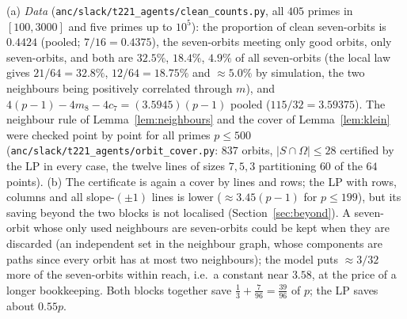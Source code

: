 \begin{remark}
(a) \emph{Data} (\texttt{anc/slack/t221\_agents/clean\_counts.py}, all $405$ primes in $[100,3000]$ and five primes up to $10^5$): the
proportion of clean seven-orbits is $0.4424$ (pooled; $7/16=0.4375$), the seven-orbits meeting only good orbits, only seven-orbits, and
both are $32.5\%$, $18.4\%$, $4.9\%$ of all seven-orbits (the local law gives $21/64=32.8\%$, $12/64=18.75\%$ and $\approx5.0\%$ by
simulation, the two neighbours being positively correlated through $m$), and $4(p-1)-4m_8-4c_7=(3.5945)(p-1)$ pooled
($115/32=3.59375$).  The neighbour rule of Lemma~\ref{lem:neighbours} and the cover of Lemma~\ref{lem:klein} were checked
point by point for all primes $p\le500$ (\texttt{anc/slack/t221\_agents/orbit\_cover.py}: $837$ orbits, $|S\cap\Omega|\le28$ certified by
the LP in every case, the twelve lines of sizes $7,5,3$ partitioning $60$ of the $64$ points).
(b) The certificate is again a cover by lines and rows; the LP with rows, columns and all slope-$(\pm1)$ lines is lower ($\approx3.45(p-1)$
for $p\le199$), but its saving beyond the two blocks is not localised (Section~\ref{sec:beyond}).  A seven-orbit whose only used neighbours
are seven-orbits could be kept when they are discarded (an independent set in the neighbour graph, whose components are paths since every
orbit has at most two neighbours); the model puts $\approx3/32$ more of the seven-orbits within reach, i.e.\ a constant near $3.58$, at the
price of a longer bookkeeping.  Both blocks together save $\tfrac13+\tfrac7{96}=\tfrac{39}{96}$ of $p$; the LP saves about $0.55p$.
\end{remark}
